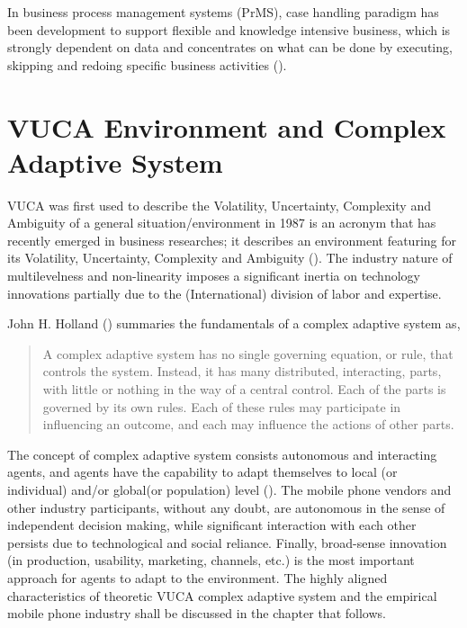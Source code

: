 \documentclass[utf8,english]{gradu3}
\begin{document}
In business process management systems (PrMS), case handling paradigm has been development to support flexible and knowledge intensive business, which is strongly dependent on data and concentrates on what can be done by executing, skipping and redoing specific business activities (\cite{van2005case}).

\section{VUCA Environment and Complex Adaptive System}

VUCA was first used to describe the Volatility, Uncertainty, Complexity and Ambiguity of a general situation/environment in 1987 is an acronym that has recently emerged in business researches; it describes an environment featuring for its Volatility, Uncertainty, Complexity and Ambiguity (\cite{bennett2014difference}). The industry nature of multilevelness and non-linearity imposes a significant inertia on technology innovations partially due to the (International) division of labor and expertise.

John H. Holland (\citeyear{holland1992complex}) summaries the fundamentals of a complex adaptive system as,

\begin{quote}
A complex adaptive system has no single governing equation, or rule, that controls the system. Instead, it has many distributed, interacting, parts, with little or nothing in the way of a central control. Each of the parts is governed by its own rules. Each of these rules may participate in influencing an outcome, and each may influence the actions of other parts.
\end{quote}

The concept of complex adaptive system consists autonomous and interacting agents, and agents have the capability to adapt themselves to local (or individual) and/or global(or population) level (\cite{macal2010tutorial}). The mobile phone vendors and other industry participants, without any doubt, are autonomous in the sense of independent decision making, while significant interaction with each other persists due to technological and social reliance. Finally, broad-sense innovation (in production, usability, marketing, channels, etc.) is the most important approach for agents to adapt to the environment. The highly aligned characteristics of theoretic VUCA complex adaptive system and the empirical mobile phone industry shall be discussed in the chapter that follows. 
\end{document}
